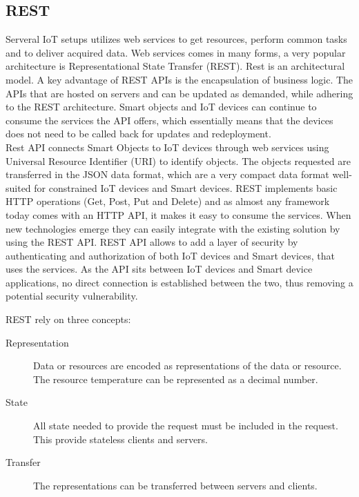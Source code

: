 \subsection{REST}
Serveral IoT setups utilizes web services to get resources, perform common tasks and to deliver acquired data. Web services comes in many forms, a very popular architecture is Representational State Transfer (REST). Rest is an architectural model. A key advantage of REST APIs is the encapsulation of business logic. The APIs that are hosted on servers and can be updated as demanded, while adhering to the REST architecture. Smart objects and IoT devices can continue to consume the services the API offers, which essentially means that the devices does not need to be called back for updates and redeployment. \\

Rest API connects Smart Objects to IoT devices through web services using Universal Resource Identifier (URI) to identify objects. The objects requested are transferred in the JSON data format, which are a very compact data format well-suited for constrained IoT devices and Smart devices. REST implements basic HTTP operations (Get, Post, Put and Delete) and as almost any framework today comes with an HTTP API, it makes it easy to consume the services. When new technologies emerge they can easily integrate with the existing solution by using the REST API. REST API allows to add a layer of security by authenticating and authorization of both IoT devices and Smart devices, that uses the services. As the API sits between IoT devices and Smart device applications, no direct connection is established between the two, thus removing a potential security vulnerability. 

REST rely on three concepts: 
\begin{description}
    \item[Representation] Data or resources are encoded as representations of the data or resource. The resource temperature can be represented as a decimal number.
    \item[State] All state needed to provide the request must be included in the request. This provide stateless clients and servers. 
    \item[Transfer] The representations can be transferred between servers and clients.
    \cite{smartthings} 
\end{description} 
